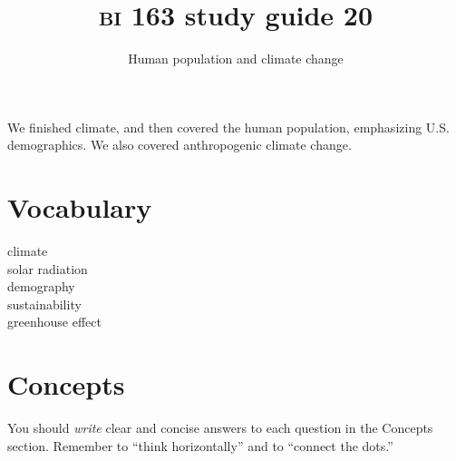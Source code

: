 \documentclass[letterpaper]{tufte-handout}
\title{{\scshape bi} 163 study guide 20}
\author{Human population and climate change }
\date{} %
\begin{document}
\maketitle	%

We finished climate, and then covered the human population, emphasizing U.S. demographics. We also covered anthropogenic climate change.

\section*{Vocabulary}

\vspace{-1\baselineskip}
\begin{multicols}{2}
climate \\
solar radiation \\
demography \\
sustainability \\
greenhouse effect
\end{multicols}

\section*{Concepts}

You should \emph{write} clear and concise answers to each question in the Concepts section.  Remember to ``think horizontally'' and to ``connect the dots.'' 
\end{document}
